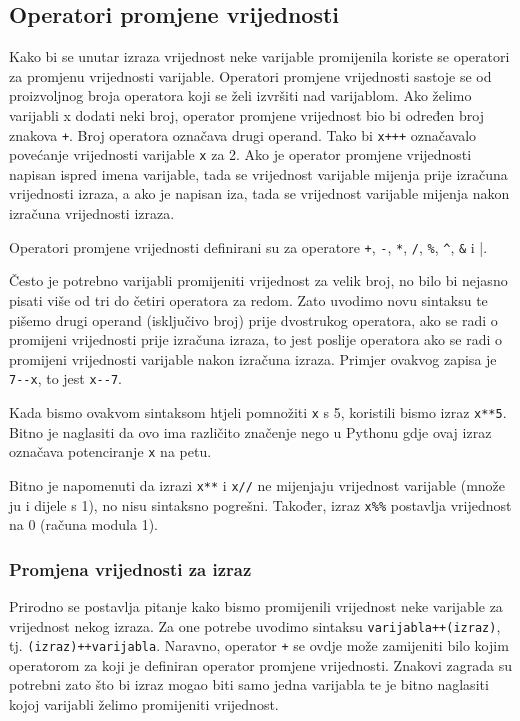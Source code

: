 \documentclass[times, utf8, zavrsni]{fer}
\begin{document}
\subsection{Operatori promjene vrijednosti}
Kako bi se unutar izraza vrijednost neke varijable promijenila koriste se operatori za promjenu vrijednosti varijable. Operatori promjene vrijednosti sastoje se od proizvoljnog
broja operatora koji se želi izvršiti nad varijablom. Ako želimo varijabli x dodati neki broj, operator promjene vrijednost bio bi određen broj znakova \verb|+|. Broj operatora
označava drugi operand. Tako bi \verb|x+++| označavalo povećanje vrijednosti varijable \verb|x| za 2. Ako je operator promjene vrijednosti napisan ispred imena varijable,
tada se vrijednost varijable mijenja prije izračuna vrijednosti izraza, a ako je napisan iza, tada se vrijednost varijable mijenja nakon izračuna vrijednosti izraza.

Operatori promjene vrijednosti definirani su za operatore \verb|+|, \verb|-|, \verb|*|, \verb|/|, \verb|%|, \verb|^|, \verb|&| i \verb|||.

Često je potrebno varijabli promijeniti vrijednost za velik broj, no bilo bi nejasno pisati više od tri do četiri operatora za redom. Zato uvodimo novu sintaksu
te pišemo drugi operand (isključivo broj) prije dvostrukog operatora, ako se radi o promijeni vrijednosti prije izračuna izraza, to jest poslije operatora ako se radi o promijeni
vrijednosti varijable nakon izračuna izraza. Primjer ovakvog zapisa je \verb|7--x|, to jest \verb|x--7|.

Kada bismo ovakvom sintaksom htjeli pomnožiti \verb|x| s 5, koristili bismo izraz \verb|x**5|. Bitno je naglasiti da ovo ima različito značenje nego u Pythonu gdje 
ovaj izraz označava potenciranje \verb|x| na petu.

Bitno je napomenuti da izrazi \verb|x**| i \verb|x//| ne mijenjaju vrijednost varijable (množe ju i dijele s 1), no nisu sintaksno pogrešni. Također, izraz
\verb|x%%| postavlja vrijednost na 0 (računa modula 1).

\subsubsection{Promjena vrijednosti za izraz}
Prirodno se postavlja pitanje kako bismo promijenili vrijednost neke varijable za vrijednost nekog izraza. Za one potrebe uvodimo sintaksu \verb|varijabla++(izraz)|,
tj. \verb|(izraz)++varijabla|. Naravno, operator \verb|+| se ovdje može zamijeniti bilo kojim operatorom za koji je definiran operator promjene vrijednosti.
Znakovi zagrada su potrebni zato što bi izraz mogao biti samo jedna varijabla te je bitno naglasiti kojoj varijabli želimo promijeniti vrijednost.
\end{document}
